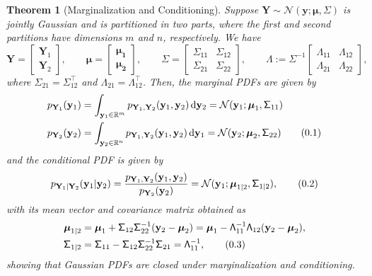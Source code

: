 \documentclass[10pt]{article}
\newtheorem{thm}{Theorem}[section]
\theoremstyle{definition}
\theoremstyle{definition}
\theoremstyle{remark}
\newcommand\eqnum{\addtocounter{equation}{1}\tag{\arabic{section}.\arabic{equation}}}
\DeclareMathOperator{\df}{d\!}
\begin{document}
\begin{thm}[Marginalization and Conditioning]\label{thm:MVN:MC}
Suppose $\mathbf{Y}\sim\mathcal{N}(\mathcal{\mathbf{y}; \boldsymbol{\mu}, \mathsf{\Sigma}})$ is jointly Gaussian and is partitioned in two parts, where the first and second partitions have dimensions $m$ and $n$, respectively. We have
\begin{equation}
\mathbf{Y} =
\begin{bmatrix}
\mathbf{Y}_1 \\
\mathbf{Y}_2
\end{bmatrix}, \qquad
\boldsymbol{\mu} = 
\begin{bmatrix}
\boldsymbol{\mu_1} \\
\boldsymbol{\mu_2}
\end{bmatrix}, \qquad
\mathsf{\Sigma} = 
\begin{bmatrix}
\mathsf{\Sigma_{11}} & \mathsf{\Sigma_{12}} \\
\mathsf{\Sigma_{21}} & \mathsf{\Sigma_{22}}
\end{bmatrix}, \qquad
\mathsf{\Lambda} := \mathsf{\Sigma}^{-1}
\begin{bmatrix}
\mathsf{\Lambda_{11}} & \mathsf{\Lambda_{12}} \\
\mathsf{\Lambda_{21}} & \mathsf{\Lambda_{22}}
\end{bmatrix},
\end{equation}
where $\mathsf{\Sigma}_{21} = \mathsf{\Sigma}_{12}^{\top}$ and $\mathsf{\Lambda}_{21} = \mathsf{\Lambda}_{12}^{\top}$. Then, the marginal PDFs are given by
\begin{align*}
p_{\mathbf{Y}_1}(\mathbf{y}_1) &= \int_{\mathbf{y}_1\in\mathbb{R}^m}p_{\mathbf{Y}_1,\mathbf{Y}_2}(\mathbf{y}_1, \mathbf{y}_2)\df \mathbf{y}_2 = \mathcal{N}(\mathbf{y}_1; \boldsymbol{\mu}_1, \mathsf{\Sigma}_{11}) \\
p_{\mathbf{Y}_2}(\mathbf{y}_2) &= \int_{\mathbf{y}_2\in\mathbb{R}^n}p_{\mathbf{Y}_1,\mathbf{Y}_2}(\mathbf{y}_1, \mathbf{y}_2)\df \mathbf{y}_1 = \mathcal{N}(\mathbf{y}_2; \boldsymbol{\mu}_2, \mathsf{\Sigma}_{22})
\eqnum
\label{eq:MVN:marg}
\end{align*}
and the conditional PDF is given by
\begin{equation*}
p_{\mathbf{Y}_1|\mathbf{Y}_2}(\mathbf{y}_1|\mathbf{y}_2) = \frac{p_{\mathbf{Y}_1,\mathbf{Y}_2}(\mathbf{y}_1,\mathbf{y}_2)}{p_{\mathbf{Y}_2}(\mathbf{y}_2)} = \mathcal{N}(\mathbf{y}_1;\boldsymbol{\mu}_{1|2},\mathsf{\Sigma}_{1|2}),
\eqnum
\end{equation*}
with its mean vector and covariance matrix obtained as
\begin{align*}
\boldsymbol{\mu}_{1|2} &= \boldsymbol{\mu}_1 + \mathsf{\Sigma}_{12}\mathsf{\Sigma}_{22}^{-1}(\mathbf{y}_2-\boldsymbol{\mu}_2) =
\boldsymbol{\mu}_1 - \mathsf{\Lambda}_{11}^{-1}\mathsf{\Lambda}_{12}(\mathbf{y}_2-\boldsymbol{\mu}_2), \\
\mathsf{\Sigma}_{1|2} &= \mathsf{\Sigma}_{11} - \mathsf{\Sigma}_{12} \mathsf{\Sigma}_{22}^{-1} \mathsf{\Sigma}_{21} = \mathsf{\Lambda}_{11}^{-1},
\eqnum
\label{eq:MVN:cond}
\end{align*}
showing that Gaussian PDFs are closed under marginalization and conditioning.
\end{thm}
\end{document}

